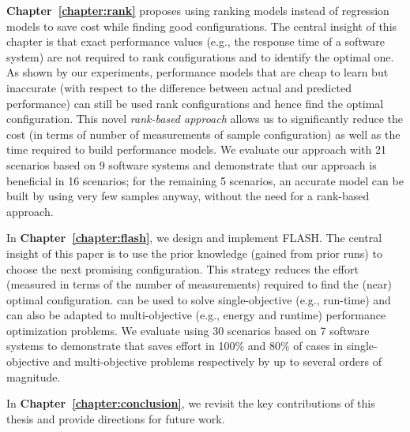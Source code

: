 \textbf{Chapter~\ref{chapter:rank}} proposes using ranking models instead of regression models to save cost while finding good configurations. The central  insight of this chapter is that   
exact performance values (e.g., the response time of a software system) are not required to rank  configurations and to identify the optimal one. 
As shown by our experiments, performance models that are cheap to learn but inaccurate (with respect to the difference between actual and predicted performance) can still be used rank configurations and hence find the optimal configuration. This novel \emph{rank-based approach} allows us to significantly reduce the cost (in terms of number of measurements of sample configuration) as well as the time required to build performance models. We evaluate our approach with 21 scenarios based on 9 software systems and demonstrate that our approach is beneficial in 16 scenarios; for the remaining 5 scenarios, an accurate model can be built by using very few samples anyway, without the need for a rank-based approach.

In \textbf{Chapter~\ref{chapter:flash}}, we design and implement FLASH. The central insight of this paper is to use the prior knowledge (gained from prior runs) to choose the next promising configuration. This strategy reduces the effort (measured in terms of the number of measurements) required to find the (near) optimal configuration.  \flash can be used to solve single-objective (e.g., run-time) and can also be adapted to multi-objective (e.g., energy and runtime) performance optimization problems. 
We evaluate \flash  using 30 scenarios based on 7 software systems to demonstrate that \flash saves effort in 100\% and 80\% of cases in single-objective and multi-objective problems respectively by up to several orders of magnitude. 

In \textbf{Chapter~\ref{chapter:conclusion}}, we revisit the key contributions of this thesis and provide directions for future work.